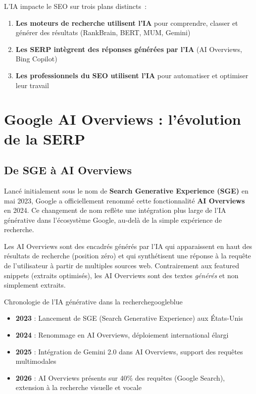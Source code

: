 \documentclass[12pt,a4paper,twoside]{report}
\newcommand{\keyword}[1]{\textbf{\textcolor{googleblue}{#1}}}
\begin{document}
L'IA impacte le SEO sur trois plans distincts~:
\begin{enumerate}
    \item \textbf{Les moteurs de recherche utilisent l'IA} pour comprendre, classer et générer des résultats (RankBrain, BERT, MUM, Gemini)
    \item \textbf{Les SERP intègrent des réponses générées par l'IA} (AI Overviews, Bing Copilot)
    \item \textbf{Les professionnels du SEO utilisent l'IA} pour automatiser et optimiser leur travail
\end{enumerate}

\section{Google AI Overviews : l'évolution de la SERP}

\subsection{De SGE à AI Overviews}

Lancé initialement sous le nom de \keyword{Search Generative Experience (SGE)} en mai 2023, Google a officiellement renommé cette fonctionnalité \keyword{AI Overviews} en 2024. Ce changement de nom reflète une intégration plus large de l'IA générative dans l'écosystème Google, au-delà de la simple expérience de recherche.

Les AI Overviews sont des encadrés générés par l'IA qui apparaissent en haut des résultats de recherche (position zéro) et qui synthétisent une réponse à la requête de l'utilisateur à partir de multiples sources web. Contrairement aux featured snippets (extraits optimisés), les AI Overviews sont des textes \emph{générés} et non simplement extraits.

\begin{mybox}{Chronologie de l'IA générative dans la recherche}{googleblue}
\begin{itemize}
    \item \textbf{2023} : Lancement de SGE (Search Generative Experience) aux États-Unis
    \item \textbf{2024} : Renommage en AI Overviews, déploiement international élargi
    \item \textbf{2025} : Intégration de Gemini 2.0 dans AI Overviews, support des requêtes multimodales
    \item \textbf{2026} : AI Overviews présents sur 40\% des requêtes (Google Search), extension à la recherche visuelle et vocale
\end{itemize}
\end{mybox}
\end{document}
